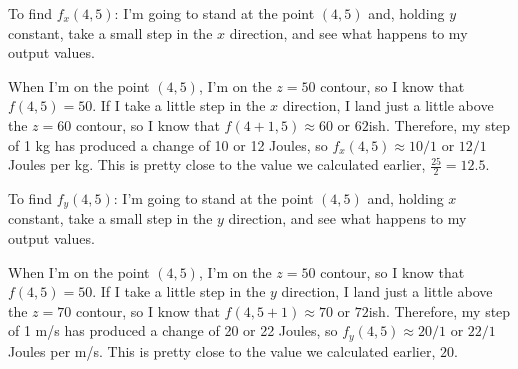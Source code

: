 \begin{enumerate}[leftmargin=0pt]
\begin{enumerate}
        \begin{red}
            To find $f_x(4,5)$: I'm going to stand at the point $(4,5)$ and, holding $y$ constant, take a small step in the $x$ direction, and see what happens to my output values.
            
            When I'm on the point $(4,5)$, I'm on the $z = 50$ contour, so I know that $f(4,5) = 50$. If I take a little step in the $x$ direction, I land just a little above the $z = 60$ contour, so I know that $f(4+1, 5) \approx 60$ or $62$ish. Therefore, my step of 1 kg has produced a change of 10 or 12 Joules, so $f_x(4,5) \approx 10/1$ or $12/1$ Joules per kg. This is pretty close to the value we calculated earlier, $\tfrac{25}{2} = 12.5$.
            
            To find $f_y(4,5)$: I'm going to stand at the point $(4,5)$ and, holding $x$ constant, take a small step in the $y$ direction, and see what happens to my output values.
            
            When I'm on the point $(4,5)$, I'm on the $z = 50$ contour, so I know that $f(4,5) = 50$. If I take a little step in the $y$ direction, I land just a little above the $z = 70$ contour, so I know that $f(4, 5+1) \approx 70$ or $72$ish. Therefore, my step of 1 m/s has produced a change of 20 or 22 Joules, so $f_y(4,5) \approx 20/1$ or $22/1$ Joules per m/s. This is pretty close to the value we calculated earlier, $20$.
            
            
        \end{red}
    \end{enumerate}

\end{enumerate}


